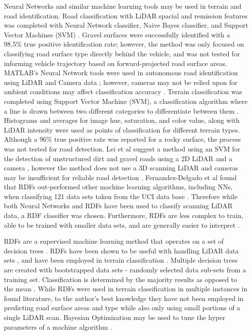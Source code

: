 \documentclass[journal,onecolumn]{IEEEtran}
\begin{document}
	{Neural Networks and similar machine learning tools may be used in terrain and road identification. Road classification with LiDAR spacial and remission features was completed with Neural Network classifier, Naive Bayes classifier, and Support Vector Machines (SVM) \cite{wang_road_nodate,wang_two-stage_2018}. Gravel surfaces were successfully identified with a 98.5\% true positive identification rate; however, the method was only focused on classifying road surface type directly behind the vehicle, and was not tested for informing vehicle trajectory based on forward-projected road surface areas. MATLAB's Neural Network tools were used in autonomous road identification using LiDAR and Camera data \cite{rasmussen_combining_2002}; however, cameras may not be relied upon for ambient conditions may affect classification accuracy \cite{levi_3d_2012_light}. Terrain classification was completed using Support Vector Machine (SVM), a classification algorithm where a line is drawn between two different categories to differentiate between them \cite{wietrzykowski_boosting_2014}. Histograms and averages for image hue, saturation, and color value, along with LiDAR intensity were used as points of classification for different terrain types. Although a 96\% true positive rate was reported for a rocky surface, the process was not tested for road detection. Lei et al suggest a method using an SVM for the detection of unstructured dirt and gravel roads using a 2D LiDAR and a camera \cite{lei_detection_2021}, however the method does not use a 3D scanning LiDAR and cameras may be insufficient for reliable road detection \cite{levi_3d_2012_light}. Fernandez-Delgado et al found that RDFs out-performed other machine learning algorithms, including NNs, when classifying 121 data sets taken from the UCI data base \cite{fernandez_delgado_we_nodate}. Therefore while both Neural Networks and RDFs have been used to classify scanning LiDAR data, a RDF classifier was chosen. Furthermore, RDFs are less complex to train, able to be trained with smaller data sets, and are generally easier to interpret \cite{nawar_comparison_2017, rosbach_neural_nodate, rosbach_neural_nodate, ahmad_trees_2017}.}

	{RDFs are a supervised machine learning method that operates on a set of decision trees \cite{ho_random_1995}. RDFs have been shown to be useful with handling LiDAR data sets \cite{breiman_random_2001}, and have been employed in terrain classification \cite{laible_3d_2012,laible_map_building,laible_terrain_2013,khan_high_2011,reymann_improving_2015,schilling_geometric_2017, wietrzykowski_context-aware_2019}. Multiple decision trees are created with bootstrapped data sets - randomly selected data sub-sets from a training set. Classification is determined by the majority results as opposed to the mean \cite{breiman_random_2001,ho_random_1995}. While RDFs were used in terrain classification in multiple instances in found literature, to the author's best knowledge they have not been employed in predicting road surface areas and type while also only using small portions of a single LiDAR scan. Bayesian Optimization may be used to tune the hyper parameters of a machine algorithm \cite{noauthor_bayesian_nodate, snoek_practical_2012}. }
\end{document}
